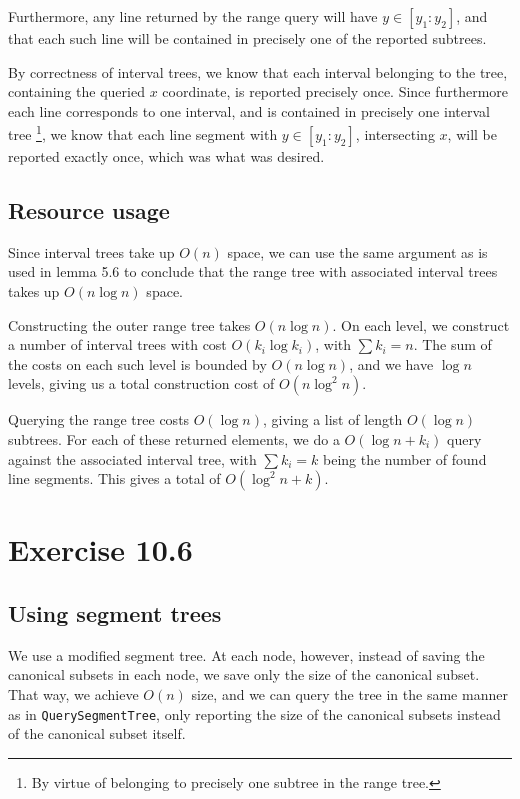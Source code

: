 \documentclass[11pt,a4paper]{article}
\begin{document}
Furthermore, any line returned by the range query will have $y \in [y_1 : y_2]$,
and that each such line will be contained in precisely one of the reported subtrees.

By correctness of interval trees, we know that each interval belonging to the tree,
containing the queried $x$ coordinate, is reported precisely once. Since furthermore
each line corresponds to one interval, and is contained in precisely one interval tree
\footnote{By virtue of belonging to precisely one subtree in the range tree.}, we know
that each line segment with $y \in [y_1 : y_2]$, intersecting $x$, will be reported
exactly once, which was what was desired.

\subsection{Resource usage}
Since interval trees take up $O(n)$ space, we can use the same argument as is used
in lemma 5.6 to conclude that the range tree with associated interval trees takes up
$O(n \log n)$ space.

Constructing the outer range tree takes $O(n \log n)$. On each level, we construct a
number of interval trees with cost $O(k_i \log k_i)$, with $\sum k_i = n$. The sum of
the costs on each such level is bounded by $O(n \log n)$, and we have $\log n$ levels,
giving us a total construction cost of $O(n \log^2 n)$.

Querying the range tree costs $O(\log n)$, giving a list of length $O(\log n)$
subtrees. For each of these returned elements, we do a $O(\log n + k_i)$ query
against the associated interval tree, with $\sum k_i = k$ being the number of
found line segments. This gives a total of $O(\log^2 n + k)$.

\section{Exercise 10.6}

\subsection{Using segment trees}

We use a modified segment tree. At each node, however, instead of
saving the canonical subsets in each node, we save only the size of
the canonical subset. That way, we achieve $O(n)$ size, and we can
query the tree in the same manner as in \verb+QuerySegmentTree+, only
reporting the size of the canonical subsets instead of the canonical
subset itself.
\end{document}
